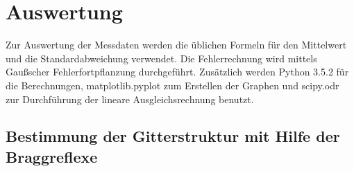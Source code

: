 \section{Auswertung}

Zur Auswertung der Messdaten werden die üblichen Formeln für den Mittelwert und die Standardabweichung verwendet. Die Fehlerrechnung wird mittels
Gaußscher Fehlerfortpflanzung durchgeführt. Zusätzlich werden Python 3.5.2 für die Berechnungen, matplotlib.pyplot zum Erstellen der Graphen und
scipy.odr zur Durchführung der lineare Ausgleichsrechnung benutzt.

\subsection{Bestimmung der Gitterstruktur mit Hilfe der Braggreflexe}



